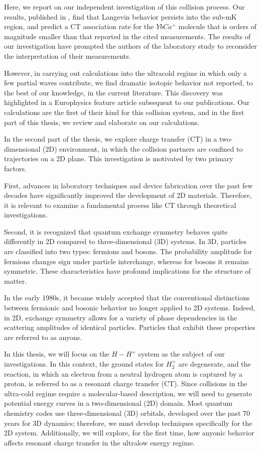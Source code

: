 Here, we report on our independent investigation of this collision process. Our results, published in \cite{ZL}, find that Langevin behavior persists into the sub-mK region, and predict a CT association rate for the $YbCa^{+}$ molecule that is orders of magnitude smaller than that reported in the cited measurements.  The results of our investigation have prompted the authors of the laboratory study to reconsider the interpretation of their measurements.

However, in carrying out calculations into the ultracold regime in which only a few partial waves contribute, we find dramatic isotopic behavior not reported, to the best of our knowledge, in the current literature. This discovery was highlighted in a Europhysics feature article \cite{Dulieu2014Europhysics} subsequent to our publications. Our calculations are the first of their kind for this collision system, and in the first part of this thesis, we review and elaborate on our calculations. 

In the second part of the thesis, we explore charge transfer (CT) in a two-dimensional (2D) environment, in which the collision partners are confined to trajectories on a 2D plane. This investigation is motivated by two primary factors. 

First, advances in laboratory techniques and device fabrication over the past few decades have significantly improved the development of 2D materials. Therefore, it is relevant to examine a fundamental process like CT through theoretical investigations.

Second, it is recognized that quantum exchange symmetry behaves quite differently in 2D compared to three-dimensional (3D) systems. In 3D, particles are classified into two types: fermions and bosons. The probability amplitude for fermions changes sign under particle interchange, whereas for bosons it remains symmetric. These characteristics have profound implications for the structure of matter.

In the early 1980s, it became widely accepted that the conventional distinctions between fermionic and bosonic behavior no longer applied to 2D systems. Indeed, in 2D, exchange symmetry allows for a variety of phase dependencies in the scattering amplitudes of identical particles. Particles that exhibit these properties are referred to as anyons.

In this thesis, we will focus on the \( H-H^{+} \) system as the subject of our investigations. In this context, the ground states for \( H_{2}^{+} \) are degenerate, and the reaction, in which an electron from a neutral hydrogen atom is captured by a proton, is referred to as a resonant charge transfer (CT). Since collisions in the ultra-cold regime require a molecular-based description, we will need to generate potential energy curves in a two-dimensional (2D) domain. Most quantum chemistry codes use three-dimensional (3D) orbitals, developed over the past 70 years for 3D dynamics; therefore, we must develop techniques specifically for the 2D system. Additionally, we will explore, for the first time, how anyonic behavior affects resonant charge transfer in the ultralow energy regime.

